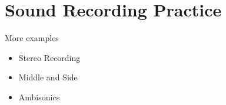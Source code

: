 
\chapter{Sound Recording Practice}
\label{examples}

More examples
\begin{itemize}
\item Stereo Recording
\item Middle and Side
\item Ambisonics



\end{itemize}
